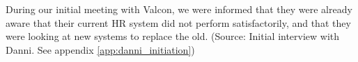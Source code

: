 During our initial meeting with Valcon, we were informed that they were already aware that their current HR system did not perform satisfactorily, and that they were looking at new systems to replace the old. (Source: Initial interview with Danni. See appendix \ref{app:danni_initiation})